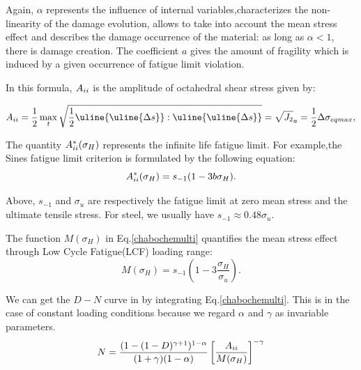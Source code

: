 Again, $\alpha$ represents the influence of internal variables,characterizes the non-linearity of the damage evolution, allows to take into account the mean stress effect and describes the damage occurrence of the material: as long as $\alpha < 1$, there is damage creation. The coefficient $a$ gives the amount of fragility which is induced by a given occurrence of fatigue limit violation.

In this formula, $A_{\uppercase\expandafter{\romannumeral2}}$ is the amplitude of octahedral shear stress given by:

\begin{equation}A_{\uppercase\expandafter{\romannumeral2}}=\frac{1}{2}\max\limits_{t}\sqrt{\frac{1}{2}\uline{\uline{\Delta s}}:\uline{\uline{\Delta s}}}=\sqrt{J_2}_a=\frac{1}{2}\Delta\sigma_{eqmax},\end{equation}

The quantity $A_{\uppercase\expandafter{\romannumeral2}}^\ast(\sigma_H)$ represents the infinite life fatigue limit. For example,the Sines fatigue limit criterion is formulated by the following equation:
\begin{equation} A_{\uppercase\expandafter{\romannumeral2}}^\ast(\sigma_H)=s_{-1}(1-3b\sigma_H).\end{equation}

Above, $s_{-1}$ and $\sigma_{u}$ are respectively the fatigue limit at zero mean stress and the ultimate tensile stress. For steel, we usually have $s_{-1}\approx 0.48\sigma_{u}$.

The function $M(\sigma_H)$ in Eq.\eqref{chabochemulti} quantifies the mean stress effect through Low Cycle Fatigue(LCF) loading range:
$$M(\sigma_H)=s_{-1}\left(1-3\frac{\sigma_H}{\sigma_u}\right).$$

We can get the $D-N$ curve in  by integrating Eq.\eqref{chabochemulti}. This is in the case of constant loading conditions because we regard $\alpha$ and $\gamma$ as invariable parameters.
\begin{equation}N =\frac{( 1 -(1-D)^{\gamma+1})^{1-\alpha}}{(1+\gamma)(1-\alpha)}\left[\frac{A_{\uppercase\expandafter{\romannumeral2}}}{M(\sigma_H)}\right]^{-\gamma} 
\label{D-N}
\end{equation} 

